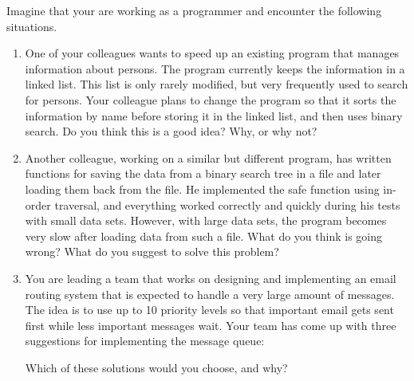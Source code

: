 \documentclass[a4paper]{article}
\begin{document}
Imagine that your are working as a programmer and encounter the following situations.

\begin{enumerate}
\item
  One of your colleagues wants to speed up an existing program that manages information about persons.
  The program currently keeps the information in a linked list.
  This list is only rarely modified, but very frequently used to search for persons.
  Your colleague plans to change the program so that it sorts the information by name before storing it in the linked list, and then uses binary search.
  Do you think this is a good idea?
  Why, or why not?
\item
  Another colleague, working on a similar but different program, has written functions for saving the data from a binary search tree in a file and later loading them back from the file.
  He implemented the safe function using in-order traversal, and everything worked correctly and quickly during his tests with small data sets.
  However, with large data sets, the program becomes very slow after loading data from such a file.
  What do you think is going wrong?
  What do you suggest to solve this problem?
\item
  You are leading a team that works on designing and implementing an email routing system that is expected to handle a very large amount of messages.
  The idea is to use up to 10 priority levels so that important email gets sent first while less important messages wait.
  Your team has come up with three suggestions for implementing the message queue:
  Which of these solutions would you choose, and why?
\end{enumerate}
\end{document}
